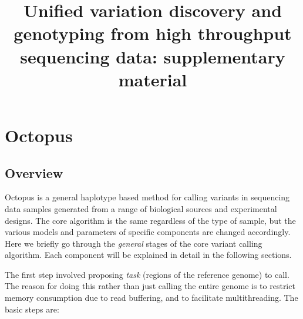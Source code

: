 \documentclass{article}
\title{Unified variation discovery and genotyping from high throughput sequencing data: supplementary material}
\author{}
\date{}
\begin{document}
\maketitle

\tableofcontents

\section{Octopus}

\subsection{Overview}

Octopus is a general haplotype based method for calling variants in sequencing data samples generated from a range of biological sources and experimental designs. The core algorithm is the same regardless of the type of sample, but the various models and parameters of specific components are changed accordingly. Here we briefly go through the \emph{general} stages of the core variant calling algorithm. Each component will be explained in detail in the following sections.

The first step involved proposing \emph{task} (regions of the reference genome) to call. The reason for doing this rather than just calling the entire genome is to restrict memory consumption due to read buffering, and to facilitate multithreading. The basic steps are:
\end{document}
